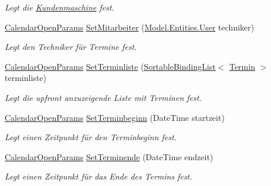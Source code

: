 \begin{DoxyCompactItemize}
\begin{DoxyCompactList}\small\item\em Legt die \hyperlink{class_products_1_1_model_1_1_entities_1_1_kundenmaschine}{Kundenmaschine} fest. \end{DoxyCompactList}\item 
\hyperlink{class_products_1_1_model_1_1_entities_1_1_calendar_open_params}{Calendar\+Open\+Params} \hyperlink{class_products_1_1_model_1_1_entities_1_1_calendar_open_params_a1809f42f778d9bf5f7cea3da7ec8f281}{Set\+Mitarbeiter} (\hyperlink{class_products_1_1_model_1_1_entities_1_1_user}{Model.\+Entities.\+User} techniker)
\begin{DoxyCompactList}\small\item\em Legt den Techniker für Termine fest. \end{DoxyCompactList}\item 
\hyperlink{class_products_1_1_model_1_1_entities_1_1_calendar_open_params}{Calendar\+Open\+Params} \hyperlink{class_products_1_1_model_1_1_entities_1_1_calendar_open_params_a461c98f26c08eccdf201c8541fb9ca87}{Set\+Terminliste} (\hyperlink{class_products_1_1_common_1_1_sortable_binding_list}{Sortable\+Binding\+List}$<$ \hyperlink{class_products_1_1_model_1_1_entities_1_1_termin}{Termin} $>$ terminliste)
\begin{DoxyCompactList}\small\item\em Legt die upfront anzuzeigende Liste mit Terminen fest. \end{DoxyCompactList}\item 
\hyperlink{class_products_1_1_model_1_1_entities_1_1_calendar_open_params}{Calendar\+Open\+Params} \hyperlink{class_products_1_1_model_1_1_entities_1_1_calendar_open_params_a4f6b8b8766163ddd638a2f96e8cae4d6}{Set\+Terminbeginn} (Date\+Time startzeit)
\begin{DoxyCompactList}\small\item\em Legt einen Zeitpunkt für den Terminbeginn fest. \end{DoxyCompactList}\item 
\hyperlink{class_products_1_1_model_1_1_entities_1_1_calendar_open_params}{Calendar\+Open\+Params} \hyperlink{class_products_1_1_model_1_1_entities_1_1_calendar_open_params_a98f4de4f85bd34261a1beb4788c75c10}{Set\+Terminende} (Date\+Time endzeit)
\begin{DoxyCompactList}\small\item\em Legt einen Zeitpunkt für das Ende des Termins fest. \end{DoxyCompactList}\item 

\end{DoxyCompactItemize}
